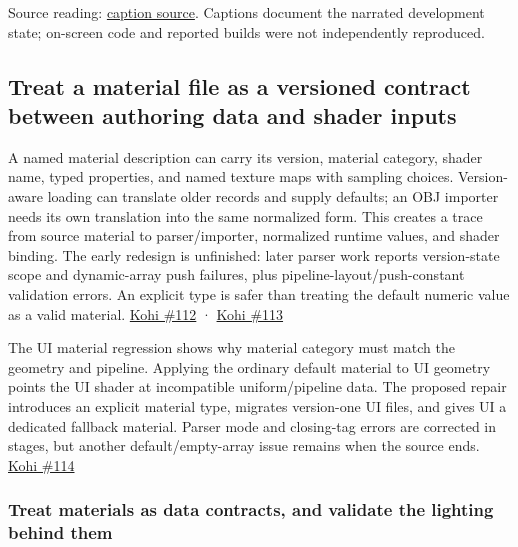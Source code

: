 Source reading: \href{https://www.youtube.com/watch?v=n7qS96720yI}{caption source}. Captions document the narrated development state; on-screen code and reported builds were not independently reproduced.

\subsection{Treat a material file as a versioned contract between authoring data and shader inputs}\label{06-engine-ii-ch025-treat-a-material-file-as-a-versioned-contract-between-authoring-data-and-shader-inputs}

\hypertarget{06-engine-ii-ch025-treat-a-material-file-as-a-versioned-contract-between-authoring-data-and-shader-inputs}{}

A named material description can carry its version, material category, shader name, typed properties, and named texture maps with sampling choices. Version-aware loading can translate older records and supply defaults; an OBJ importer needs its own translation into the same normalized form. This creates a trace from source material to parser/importer, normalized runtime values, and shader binding. The early redesign is unfinished: later parser work reports version-state scope and dynamic-array push failures, plus pipeline-layout/push-constant validation errors. An explicit  type is safer than treating the default numeric value as a valid material. \href{https://www.youtube.com/watch?v=-Ps-749SEs4}{Kohi \#112} · \href{https://www.youtube.com/watch?v=-lHaaoIrdFM}{Kohi \#113}

The UI material regression shows why material category must match the geometry and pipeline. Applying the ordinary default material to UI geometry points the UI shader at incompatible uniform/pipeline data. The proposed repair introduces an explicit material type, migrates version-one UI files, and gives UI a dedicated fallback material. Parser mode and closing-tag errors are corrected in stages, but another default/empty-array issue remains when the source ends. \href{https://www.youtube.com/watch?v=K-EFytY5Pmg}{Kohi \#114}

\subsubsection{Treat materials as data contracts, and validate the lighting behind them}\label{06-engine-ii-ch025-treat-materials-as-data-contracts-and-validate-the-lighting-behind-them}

